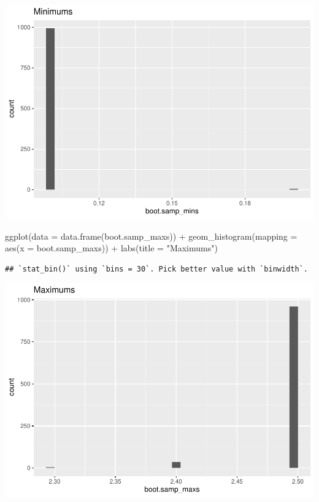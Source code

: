 \documentclass[
]{article}
\newenvironment{Shaded}{\begin{snugshade}}{\end{snugshade}}
\newcommand{\AttributeTok}[1]{\textcolor[rgb]{0.77,0.63,0.00}{#1}}
\newcommand{\FunctionTok}[1]{\textcolor[rgb]{0.00,0.00,0.00}{#1}}
\newcommand{\NormalTok}[1]{#1}
\newcommand{\SpecialCharTok}[1]{\textcolor[rgb]{0.00,0.00,0.00}{#1}}
\newcommand{\StringTok}[1]{\textcolor[rgb]{0.31,0.60,0.02}{#1}}
\begin{document}
\includegraphics{Class_Exercises_ClassNotes_5_files/figure-latex/unnamed-chunk-12-1.pdf}
\newpage

\begin{Shaded}
\begin{Highlighting}[]
\FunctionTok{ggplot}\NormalTok{(}\AttributeTok{data =} \FunctionTok{data.frame}\NormalTok{(boot.samp\_maxs)) }\SpecialCharTok{+}
  \FunctionTok{geom\_histogram}\NormalTok{(}\AttributeTok{mapping =} \FunctionTok{aes}\NormalTok{(}\AttributeTok{x =}\NormalTok{ boot.samp\_maxs)) }\SpecialCharTok{+}
  \FunctionTok{labs}\NormalTok{(}\AttributeTok{title =} \StringTok{"Maximums"}\NormalTok{)}
\end{Highlighting}
\end{Shaded}

\begin{verbatim}
## `stat_bin()` using `bins = 30`. Pick better value with `binwidth`.
\end{verbatim}

\includegraphics{Class_Exercises_ClassNotes_5_files/figure-latex/unnamed-chunk-13-1.pdf}
\end{document}
